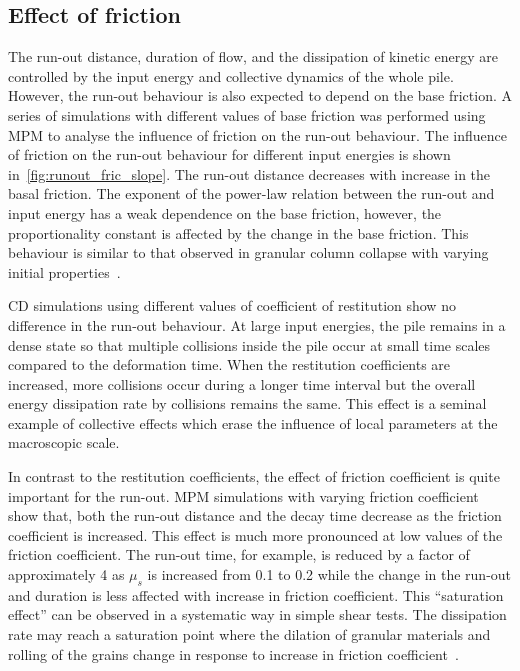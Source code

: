 \subsection{Effect of friction}
\label{sec:parameters}

The run-out distance, duration of flow, and the dissipation of kinetic energy 
are controlled by the input energy and collective dynamics of the whole pile. 
However, the run-out behaviour is also expected to depend on the base friction. 
A series of simulations with different values of base friction was performed 
using MPM to analyse the influence of friction on the run-out behaviour. The 
influence of friction on the run-out behaviour for different input energies is 
shown in~\cref{fig:runout_fric_slope}. The run-out distance decreases with 
increase in the basal friction. The exponent of the 
power-law relation between the run-out and input energy has a weak dependence 
on the base friction, however, the proportionality constant is affected by the 
change in the base friction. This behaviour is similar to that observed in 
granular column collapse with varying initial 
properties~\citep{Balmforth2005,Lajeunesse2005}. 

CD simulations using different values of coefficient of restitution show no 
difference in the run-out behaviour. At large input energies, the pile remains 
in a dense state so that multiple collisions inside the pile occur at small 
time scales compared to the deformation time. When the restitution coefficients 
are increased, more collisions occur during a longer time interval but the 
overall energy dissipation rate by collisions remains the same. This effect is 
a seminal example of collective effects which erase the influence of local 
parameters at the macroscopic scale.

In contrast to the restitution coefficients, the effect of friction 
coefficient is quite important for the run-out. MPM simulations with 
varying friction coefficient show that, both the run-out distance and the 
decay time decrease as the friction coefficient is increased. This 
effect is much more pronounced at low values of the friction coefficient. 
The run-out time, for example, is reduced by a factor of approximately 4 as 
$\mu_s$ is increased from 0.1 to 0.2 while the change in the run-out and 
duration is less affected with increase in friction coefficient. This 
``saturation effect'' can be observed in a systematic way in simple shear 
tests. The dissipation rate may reach a saturation point where the dilation of 
granular materials and rolling of the grains change in response to increase in 
friction coefficient~\citep{Estrada2008}.

